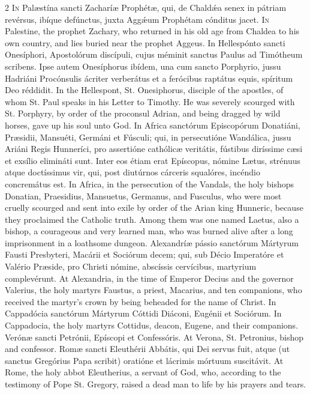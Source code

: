 \begin{paracol}{2}
\lettrine[lines=2]{I}{n} Palæstína sancti 
 Zacharíæ Prophétæ, qui, de Chaldǽa senex in pátriam revérsus, ibíque 
 defúnctus, juxta Aggǽum Prophétam cónditus jacet.
\switchcolumn
{}
\lettrine[lines=2]{I}{n} Palestine, the prophet Zachary, 
 who returned in his old age from Chaldea to his own country, and lies buried 
 near the prophet Aggeus.
\switchcolumn*
{}
In Hellespónto sancti 
 Onesíphori, Apostolórum discípuli, cujus méminit sanctus Paulus ad Timótheum 
 scribens. Ipse autem Onesíphorus ibídem, una cum sancto Porphyrio, 
 jussu Hadriáni Procónsulis ácriter verberátus et a ferócibus raptátus equis, 
 spíritum Deo réddidit.
\switchcolumn
{}
In the Hellespont, St. Onesiphorus, 
 disciple of the apostles, of whom St. Paul speaks in his Letter to Timothy. 
 He was severely scourged with St. Porphyry, by order of the proconsul 
 Adrian, and being dragged by wild horses, gave up his soul unto God.
\switchcolumn*
{}
In Africa sanctórum 
 Episcopórum Donatiáni, Præsidii, Mansuéti, Germáni et Fúsculi; qui, in 
 persecutióne Wandálica, jussu Ariáni Regis Hunneríci, pro assertióne 
 cathólicæ veritátis, fústibus diríssime cæsi et exsílio elimináti sunt. 
 Inter eos étiam erat Epíscopus, nómine Lætus, strénuus atque doctíssimus vir, 
 qui, post diutúrnos cárceris squalóres, incéndio concremátus est.
\switchcolumn
{}
In Africa, in the persecution of the 
 Vandals, the holy bishops Donatian, Praesidius, Mansuetus, Germanus, and 
 Fusculus, who were most cruelly scourged and sent into exile by order of the 
 Arian king Hunneric, because they proclaimed the Catholic truth. Among 
 them was one named Laetus, also a bishop, a courageous and very learned man, 
 who was burned alive after a long imprisonment in a loathsome dungeon.
\switchcolumn*
{}
Alexandríæ pássio 
 sanctórum Mártyrum Fausti Presbyteri, Macárii et Sociórum decem; qui, sub 
 Décio Imperatóre et Valério Præside, pro Christi nómine, abscíssis 
 cervícibus, martyrium complevérunt.
\switchcolumn
{}
At Alexandria, in the time of 
 Emperor Decius and the governor Valerius, the holy martyrs Faustus, a 
 priest, Macarius, and ten companions, who received the martyr's crown by 
 being beheaded for the name of Christ.
\switchcolumn*
{}
In Cappadócia sanctórum 
 Mártyrum Cóttidi Diáconi, Eugénii et Sociórum.
\switchcolumn
{}
In Cappadocia, the holy martyrs 
 Cottidus, deacon, Eugene, and their companions.
\switchcolumn*
{}
Verónæ sancti Petrónii, 
 Epíscopi et Confessóris.
\switchcolumn
{}
At Verona, St. Petronius, bishop and 
 confessor.
\switchcolumn*
{}
Romæ sancti Eleuthérii 
 Abbátis, qui Dei servus fuit, atque (ut sanctus Gregórius Papa scribit) 
 oratióne et lácrimis mórtuum suscitávit.
\switchcolumn
{}
At Rome, the holy abbot Eleutherius, 
 a servant of God, who, according to the testimony of Pope St. Gregory, 
 raised a dead man to life by his prayers and tears.
\switchcolumn*
{}
\end{paracol}


